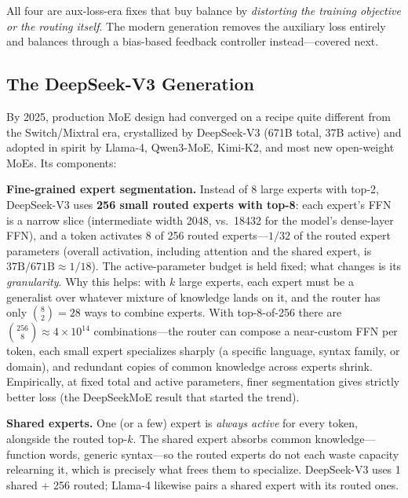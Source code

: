 All four are aux-loss-era fixes that buy balance by \textit{distorting the training objective or the routing itself}. The modern generation removes the auxiliary loss entirely and balances through a bias-based feedback controller instead---covered next.

\subsection{The DeepSeek-V3 Generation}
\label{subsec:moe_deepseek_gen}

By 2025, production MoE design had converged on a recipe quite different from the Switch/Mixtral era, crystallized by DeepSeek-V3 (671B total, 37B active) and adopted in spirit by Llama-4, Qwen3-MoE, Kimi-K2, and most new open-weight MoEs. Its components:

\textbf{Fine-grained expert segmentation.} Instead of 8 large experts with top-2, DeepSeek-V3 uses \textbf{256 small routed experts with top-8}: each expert's FFN is a narrow slice (intermediate width 2048, vs.\ 18432 for the model's dense-layer FFN), and a token activates 8 of 256 routed experts---$1/32$ of the routed expert parameters (overall activation, including attention and the shared expert, is $37\text{B}/671\text{B} \approx 1/18$). The active-parameter budget is held fixed; what changes is its \textit{granularity}. Why this helps: with $k$ large experts, each expert must be a generalist over whatever mixture of knowledge lands on it, and the router has only $\binom{8}{2} = 28$ ways to combine experts. With top-8-of-256 there are $\binom{256}{8} \approx 4 \times 10^{14}$ combinations---the router can compose a near-custom FFN per token, each small expert specializes sharply (a specific language, syntax family, or domain), and redundant copies of common knowledge across experts shrink. Empirically, at fixed total and active parameters, finer segmentation gives strictly better loss (the DeepSeekMoE result that started the trend).

\textbf{Shared experts.} One (or a few) expert is \textit{always active} for every token, alongside the routed top-$k$. The shared expert absorbs common knowledge---function words, generic syntax---so the routed experts do not each waste capacity relearning it, which is precisely what frees them to specialize. DeepSeek-V3 uses 1 shared + 256 routed; Llama-4 likewise pairs a shared expert with its routed ones.

